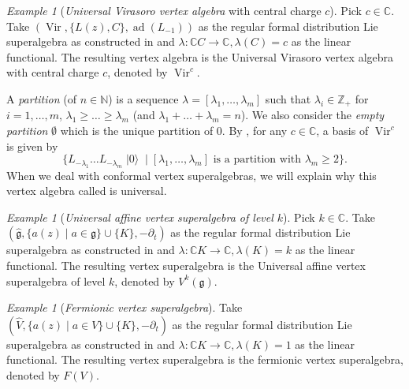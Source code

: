 \documentclass[a4paper, 12pt, reqno]{amsart}
\theoremstyle{remark}
\newtheorem{example}[theorem]{Example}
\numberwithin{equation}{subsection}
\DeclareMathOperator{\Vir}{Vir}
\DeclareMathOperator{\vac}{|0\rangle}
\DeclareMathOperator{\ad}{ad}
\begin{document}
\begin{example}[\emph{Universal Virasoro vertex algebra} with central charge $c$]
  \label{exa:5}
  Pick $c \in \mathbb{C}$.
  Take $(\Vir, \{L(z), C\}, \ad(L_{-1}))$ as the regular formal distribution Lie superalgebra as constructed in  and $\lambda: \mathbb{C}C \to \mathbb{C}, \lambda(C) = c$ as the linear functional.
  The resulting vertex algebra is the Universal Virasoro vertex algebra with central charge $c$, denoted by $\Vir^c$.

  A \emph{partition} (of $n \in \mathbb{N}$) is a sequence $\lambda = [\lambda_1, \dots, \lambda_m]$ such that $\lambda_i \in \mathbb{Z}_+$ for $i = 1, \dots, m$, $\lambda_1 \ge \dots \ge \lambda_m$ (and $\lambda_1 + \dots + \lambda_m = n$).
  We also consider the \emph{empty partition} $\emptyset$ which is the unique partition of $0$.
  By , for any $c \in \mathbb{C}$, a basis of $\Vir^c$ is given by
  \begin{equation*}
    \{L_{-\lambda_1}\dots L_{-\lambda_m}\vac \mid [\lambda_1, \dots, \lambda_m]\text{ is a partition with }\lambda_m \ge 2\}.
  \end{equation*}
  When we deal with conformal vertex superalgebras, we will explain why this vertex algebra called is universal.
\end{example}

\begin{example}[\emph{Universal affine vertex superalgebra of level $k$}]
  \label{exa:6}
  Pick $k \in \mathbb{C}$.
  Take $(\hat{\mathfrak{g}}, \{a(z) \mid a \in \mathfrak{g}\} \cup \{K\}, -\partial_t)$ as the regular formal distribution Lie superalgebra as constructed in  and $\lambda: \mathbb{C}K \to \mathbb{C}, \lambda(K) = k$ as the linear functional.
  The resulting vertex superalgebra is the Universal affine vertex superalgebra of level $k$, denoted by $V^k(\mathfrak{g})$.
\end{example}

\begin{example}[\emph{Fermionic vertex superalgebra}]
  \label{exa:7}
  Take $(\widehat{V}, \{a(z) \mid a \in V\} \cup \{K\}, -\partial_t)$ as the regular formal distribution Lie superalgebra as constructed in  and $\lambda: \mathbb{C}K \to \mathbb{C}, \lambda(K) = 1$ as the linear functional.
  The resulting vertex superalgebra is the fermionic vertex superalgebra, denoted by $F(V)$.
\end{example}
\end{document}
